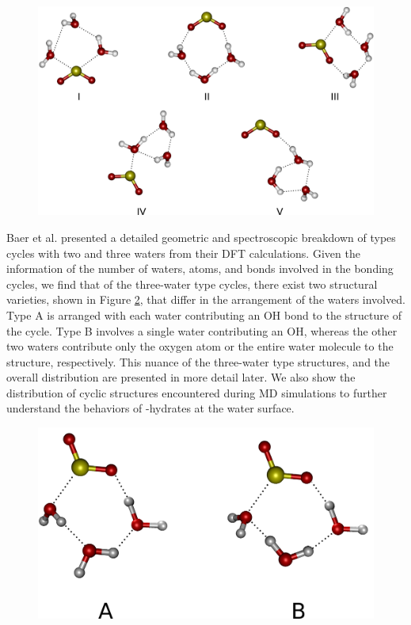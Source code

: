\begin{figure}[h!]
	\begin{center}
		\includegraphics[scale=1.0]{images/cycles/cycle-types-small.png}
		\caption{}
		\label{fig:cyclic-structures}
	\end{center}
\end{figure}

Baer et al. presented a detailed geometric and spectroscopic breakdown of types  cycles with two and three waters from their DFT calculations.\cite{Baer2010} Given the information of the number of waters, atoms, and bonds involved in the bonding cycles, we find that of the three-water type  cycles, there exist two structural varieties, shown in Figure \ref{fig:type-3-varieties}, that differ in the arrangement of the waters involved. Type A is arranged with each water contributing an OH bond to the structure of the cycle. Type B involves a single water contributing an OH, whereas the other two waters contribute only the oxygen atom or the entire water molecule to the structure, respectively. This nuance of the three-water type  structures, and the overall distribution are presented in more detail later. We also show the distribution of cyclic structures encountered during MD simulations to further understand the behaviors of \suldiox-hydrates at the water surface.

\begin{figure}[h!]
	\begin{center}
		\includegraphics[scale=1.0]{images/cycles/triple-cycle-types-small.png}
		\caption{}
		\label{fig:type-3-varieties}
	\end{center}
\end{figure}
